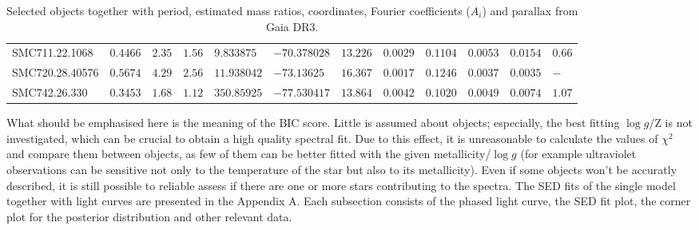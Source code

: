 \documentclass{pracalicmgr}
\begin{document}
\begin{table}[H]
{\begin{tabular}{llllllllllll}
    SMC711.22.1068  & $0.4466$  & $2.35$  & $1.56$ & $9.833875$   & $-70.378028$ & $13.226$ & $0.0029$  & $0.1104$ & $0.0053$  & $0.0154$ & $0.66$     \\[0.1cm]
    SMC720.28.40576 & $0.5674$ & $4.29$  & $2.56$ & $11.938042$  & $-73.13625$  & $16.367$  & $0.0017$ & $0.1246$ & $0.0037$  & $0.0035$ &  $-$    \\[0.1cm]
    SMC742.26.330   & $0.3453$ & $1.68$ & $1.12$ & $350.85925$  & $-77.530417$ & $13.864$ & $0.0042$   & $0.1020$ & $0.0049$ & $0.0074$ & $1.07$   \\[0.1cm]
    \hline
    \end{tabular}
    }
    \caption{Selected objects together with period, estimated mass ratios, coordinates, Fourier coefficients ($A_i$) and parallax from Gaia DR3.}\label{objects}
\end{table}
What should be emphasised here is the meaning of the BIC score. Little is assumed about objects; especially, the best fitting
$\log{g}$/Z is not investigated, which can be crucial to obtain a high quality spectral fit. Due to this effect, it is unreasonable to calculate the values of $\chi^2$ and compare them
between objects, as few of them can be better fitted with the given metallicity/$\log{g}$
(for example ultraviolet observations can be sensitive not only to the temperature of the star but also to its metallicity).
Even if some objects won't be accuratly described, it is still possible to reliable assess if there are one or more stars contributing to the spectra.
The SED fits of the single model together with light curves are presented in the Appendix A. Each subsection consists of the phased light curve, the
SED fit plot, the corner plot for the posterior distribution and other relevant data.
\newpage
\end{document}
